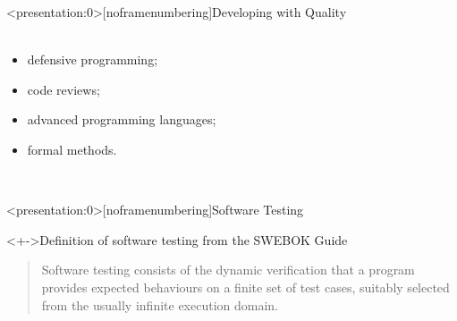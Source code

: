 \documentclass[handout]{beamer}
\begin{document}
\begin{frame}<presentation:0>[noframenumbering]{Developing with Quality}
    \\~\\
    \begin{itemize}[<+->]
        \item{} defensive programming;
        \item{} code reviews;
        \item{} advanced programming languages;
        \item{} formal methods.
    \end{itemize}~\\
\end{frame}

\begin{frame}<presentation:0>[noframenumbering]{Software Testing}
    \begin{block}<+->{Definition of software testing from the SWEBOK Guide}
        \begin{quote}
            Software testing consists of the \alert{dynamic} verification that a
            program provides \alert{expected} behaviours on a \alert{finite} set
            of test cases, suitably \alert{selected} from the usually infinite
            execution domain.
        \end{quote}
    \end{block}
\end{frame}
\end{document}
